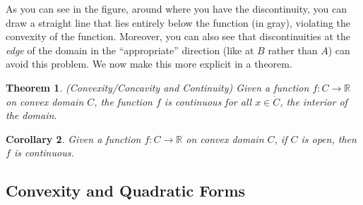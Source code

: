 \documentclass[12pt]{book}
\numberwithin{equation}{section} %
\theoremstyle{plain}
\newtheorem{thm}{Theorem}[section]
\newtheorem{cor}[thm]{Corollary}
\theoremstyle{definition}
\theoremstyle{remark}
\newcommand{\R}{\mathbb{R}}
\begin{document}
As you can see in the figure, around where you have the discontinuity,
you can draw a straight line that lies entirely below the function (in
gray), violating the convexity of the function. Moreover, you can also
see that discontinuities at the \emph{edge} of the domain in the
``appropriate'' direction (like at $B$ rather than $A$) can avoid this
problem. We now make this more explicit in a theorem.

\begin{thm}{\emph{(Convexity/Concavity and Continuity)}}
Given a function $f:C\rightarrow\R$ on convex domain $C$, the function
$f$ is continuous for all $x \in \mathring{C}$, the interior of the
domain.
\end{thm}

\begin{cor}
Given a function $f:C\rightarrow\R$ on convex domain $C$, if $C$ is
open, then $f$ is continuous.
\end{cor}

\subsection{Convexity and Quadratic Forms}
\end{document}

